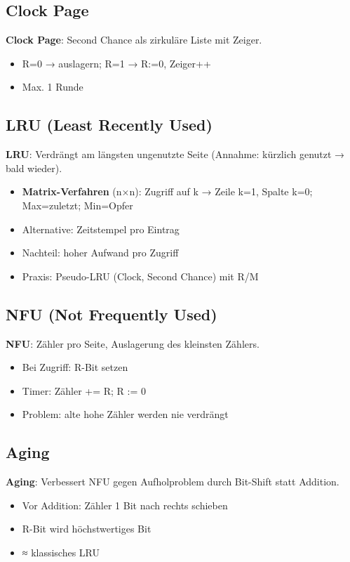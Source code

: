 \documentclass[11pt, a4paper]{article}
\begin{document}
\subsection{Clock Page}
\textbf{Clock Page}: Second Chance als zirkuläre Liste mit Zeiger.

\begin{itemize}
  \item R=0 → auslagern; R=1 → R:=0, Zeiger++
  \item Max. 1 Runde
\end{itemize}


\subsection{LRU (Least Recently Used)}
\textbf{LRU}: Verdrängt am längsten ungenutzte Seite (Annahme: kürzlich genutzt → bald wieder).

\begin{itemize}
  \item \textbf{Matrix-Verfahren} (n×n): Zugriff auf k → Zeile k=1, Spalte k=0; Max=zuletzt; Min=Opfer
  \item Alternative: Zeitstempel pro Eintrag
  \item Nachteil: hoher Aufwand pro Zugriff
  \item Praxis: Pseudo-LRU (Clock, Second Chance) mit R/M
\end{itemize}


\subsection{NFU (Not Frequently Used)}
\textbf{NFU}: Zähler pro Seite, Auslagerung des kleinsten Zählers.

\begin{itemize}
  \item Bei Zugriff: R-Bit setzen
  \item Timer: Zähler += R; R := 0
  \item Problem: alte hohe Zähler werden nie verdrängt
\end{itemize}


\subsection{Aging}
\textbf{Aging}: Verbessert NFU gegen Aufholproblem durch Bit-Shift statt Addition.

\begin{itemize}
  \item Vor Addition: Zähler 1 Bit nach rechts schieben
  \item R-Bit wird höchstwertiges Bit
  \item ≈ klassisches LRU
\end{itemize}
\end{document}
